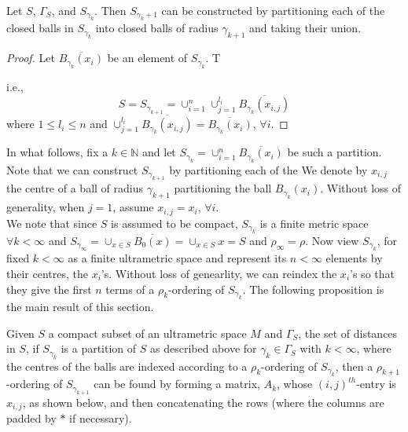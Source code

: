 \begin{lemma*}
Let $S$, $\Gamma_S$, and $S_{\gamma_k}$. Then $S_{\gamma_k+1}$ can be constructed by partitioning each of the closed balls in $S_{\gamma_k}$ into closed balls of radius $\gamma_{k+1}$ and taking their union.
\end{lemma*}

\begin{proof}
 Let $\overline{B_{\gamma_k}(x_i)}$  be an element of $S_{\gamma_k}$. T

i.e., \[S = S_{\gamma_{k+1}} = \cup_{i=1}^n \cup_{j=1}^{l_i} \overline{B_{\gamma_k}(x_{i,j})}\] where $1 \leq l_i \leq n$ and $\cup_{j=1}^{l_i} \overline{B_{\gamma_k}(x_{i,j})}=\overline{B_{\gamma_k}(x_i)}$, $\forall i$.
\end{proof}

In what follows, fix a $k \in \mathbb{N}$ and let $S_{\gamma_k} = \cup_{i=1}^n \overline{B_{\gamma_k}(x_i)}$ be such a partition. Note that we can construct $S_{\gamma_{k+1}}$ by partitioning each of the We denote by $x_{i,j}$ the centre of a ball of radius $\gamma_{k+1}$ partitioning the ball $B_{\gamma_k}(x_i)$. Without loss of generality, when $j=1$, assume $x_{i,j}=x_i$, $\forall i$.\\


We note that since $S$ is assumed to be compact,  $S_{\gamma_k}$ is a finite metric space $\forall k < \infty$ and $S_{\gamma_\infty}=\cup_{x \in S}\overline{B_0(x)} = \cup_{x \in S}x=S$ and $\rho_\infty=\rho$.  Now view $S_{\gamma_k}$, for fixed $k < \infty$ as a finite ultrametric space and represent its $n < \infty$ elements by their centres, the $x_i$'s. Without loss of genearlity, we can reindex the $x_i$'s so that they give the first $n$ terms of a $\rho_k$-ordering of $S_{\gamma_k}$. The following proposition is the main result of this section.

\begin{proposition*}
Given $S$ a compact subset of an ultrametric space $M$ and $\Gamma_S$, the set of distances in $S$, if $S_{\gamma_k}$ is a partition of $S$ as described above for $\gamma_k \in \Gamma_S$ with $k < \infty$, where the centres of the balls are indexed according to a $\rho_k$-ordering of $S_{\gamma_k}$, then a $\rho_{k+1}$-ordering of $S_{\gamma_{k+1}}$ can be found by forming a matrix, $A_k$, whose $(i,j)^{th}$-entry is $x_{i,j}$, as shown below, and then concatenating the rows (where the columns are padded by * if necessary). 
\end{proposition*}

